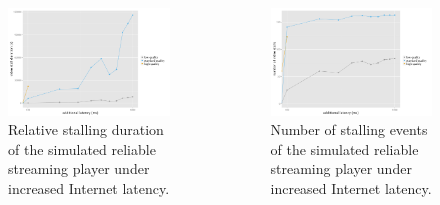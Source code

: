 \documentclass{beamer}
\begin{document}
\begin{frame}
	\begin{columns}
		\begin{figure}
			\includegraphics[width=\columnwidth]{../../chapters/06-mobilestreamingmeasurements/images/R-ltesim-latencyseries-stallduration.pdf}
			\caption{Relative stalling duration of the simulated reliable streaming player under increased Internet latency.}
		\end{figure}

		\begin{figure}
			\includegraphics[width=\columnwidth]{../../chapters/06-mobilestreamingmeasurements/images/R-ltesim-latencyseries-numstalls.pdf}
			\caption{Number of stalling events of the simulated reliable streaming player under increased Internet latency.}
		\end{figure}
	\end{columns}
\end{frame}


\setcounter{framenumber}{\value{finalframe}}
\end{document}
